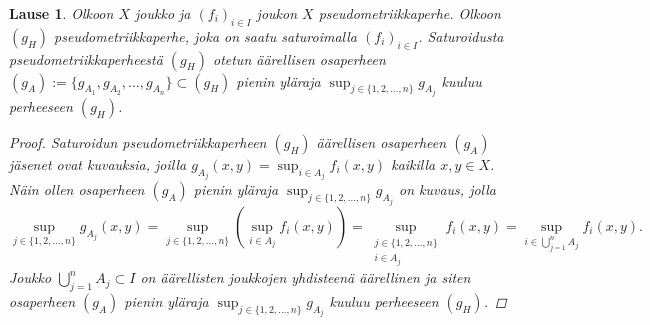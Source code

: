 \documentclass[12pt,a4paper,leqno]{report}
\theoremstyle{plain}
\newtheorem{lause}[equation]{Lause}
\theoremstyle{definition}
\theoremstyle{remark}
\begin{document}
\begin{lause}\label{saturoitu lause}
Olkoon $X$ joukko ja $(f_i)_{i\in I} $ joukon $X$ pseudometriikkaperhe. 
Olkoon $(g_{H})$ pseudometriikkaperhe, joka on saatu saturoimalla $(f_{i})_{i\in I}$. 
Saturoidusta pseudometriikkaperheestä $(g_{H})$ otetun 
äärellisen osaperheen 
$(g_A):=\{g_{A_1},g_{A_2},\dots,g_{A_n}\}\subset (g_{H})$ 
pienin yläraja 
$\sup_{j\in \{1,2,\dots , n\}}g_{A_j}$ 
kuuluu perheeseen $(g_H)$. 
\begin{proof}
Saturoidun pseudometriikkaperheen $(g_{H})$ 
äärellisen osaperheen 
$(g_A)$ jäsenet ovat kuvauksia, joilla 
$g_{A_j}(x,y)=\sup_{i\in A_j}f_i(x,y)$ kaikilla $x,y\in X$.
Näin ollen osaperheen 
$(g_A)$ pienin yläraja 
$\sup_{j\in \{1,2,\dots , n\}}g_{A_j}$ on kuvaus, 
jolla 
$$\sup_{j\in \{1,2,\dots , n\}}g_{A_j}(x,y)
=\sup_{j\in \{1,2,\dots , n\}}\left(\sup_{i\in A_j}f_i(x,y)\right)
=\sup_{\substack{j\in \{1,2,\dots , n\}\\i\in A_j}}f_i(x,y)
=\sup_{i\in \bigcup_{j=1}^n A_j}f_i(x,y)
.$$ 
Joukko $\bigcup_{j=1}^n A_j\subset I$ on äärellisten joukkojen 
yhdisteenä äärellinen ja siten 
osaperheen 
$(g_A)$ pienin yläraja $\sup_{j\in \{1,2,\dots , n\}}g_{A_j}$ kuuluu perheeseen $(g_H)$.
\end{proof}
\end{lause}
\end{document}
